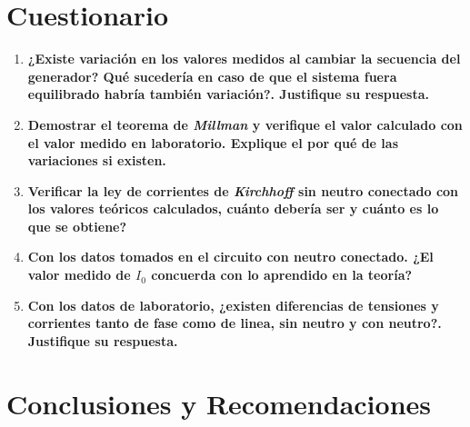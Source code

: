 \documentclass[letter,11pt]{article}
\begin{document}
\section{Cuestionario}

\begin{enumerate}

\item \textbf{¿Existe variación en los valores medidos al cambiar la secuencia
del generador? Qué sucedería en caso de que el sistema fuera equilibrado habría
también variación?. Justifique su respuesta.}

\item \textbf{Demostrar el teorema de \emph{Millman} y verifique el valor
calculado con el valor medido en laboratorio. Explique el por qué de las
variaciones si existen.}

\item \textbf{Verificar la ley de corrientes de \emph{Kirchhoff} sin neutro
conectado con los valores teóricos calculados, cuánto debería ser y cuánto es lo
que se obtiene?}

\item \textbf{Con los datos tomados en el circuito con neutro conectado. ¿El
valor medido de $I_0$ concuerda con lo aprendido en la teoría?}

\item \textbf{Con los datos de laboratorio, ¿existen diferencias de tensiones y
corrientes tanto de fase como de linea, sin neutro y con neutro?. Justifique su
respuesta.}

\end{enumerate}

\section{Conclusiones y Recomendaciones}
\end{document}
